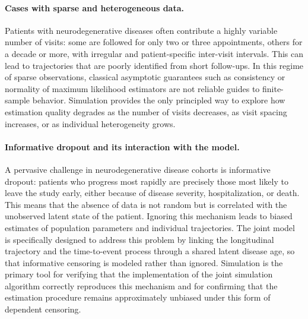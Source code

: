 \documentclass{rapportCS}
\begin{document}
\paragraph{Cases with sparse and heterogeneous data.}
Patients with neurodegenerative diseases often contribute a highly variable number of visits: some are followed for only two or three appointments, others for a decade or more, with irregular and patient-specific inter-visit intervals. This can lead to trajectories that are poorly identified from short follow-ups. In this regime of sparse observations, classical asymptotic guarantees such as consistency or normality of maximum likelihood estimators are not reliable guides to finite-sample behavior. Simulation provides the only principled way to explore how estimation quality degrades as the number of visits decreases, as visit spacing increases, or as individual heterogeneity grows.

\paragraph{Informative dropout and its interaction with the model.}
A pervasive challenge in neurodegenerative disease cohorts is informative dropout: patients who progress most rapidly are precisely those most likely to leave the study early, either because of disease severity, hospitalization, or death. This means that the absence of data is not random but is correlated with the unobserved latent state of the patient. Ignoring this mechanism leads to biased estimates of population parameters and individual trajectories. The joint model~\cite{ortholand2025multijoint, ortholand2026joint} is specifically designed to address this problem by linking the longitudinal trajectory and the time-to-event process through a shared latent disease age, so that informative censoring is modeled rather than ignored. Simulation is the primary tool for verifying that the implementation of the joint simulation algorithm correctly reproduces this mechanism and for confirming that the estimation procedure remains approximately unbiased under this form of dependent censoring.

\end{document}
